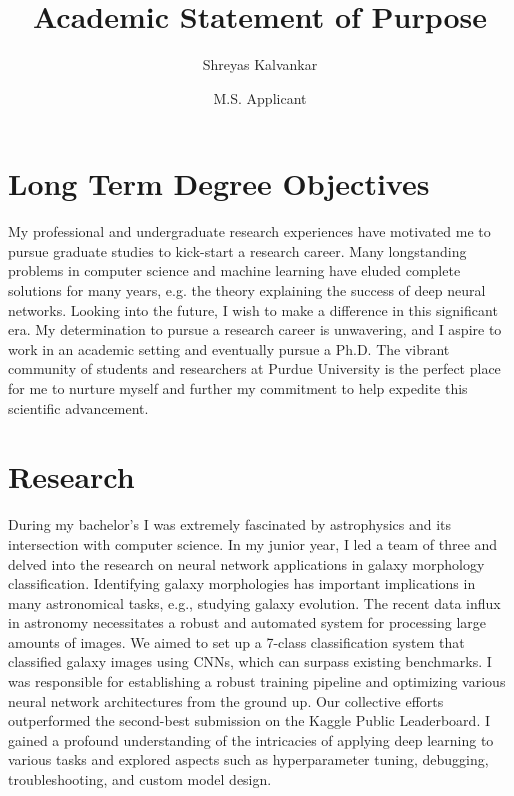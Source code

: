 \documentclass{article}
\title{Academic Statement of Purpose}
\author{Shreyas Kalvankar}
\date{M.S. Applicant}
\begin{document}
  \maketitle%
  \thispagestyle{empty}

\section*{Long Term Degree Objectives}

\hspace*{0.25in}My professional and undergraduate research experiences have motivated me to
pursue graduate studies to kick-start a research career. Many longstanding
problems in computer science and machine learning have eluded complete solutions
for many years, e.g. the theory explaining the success of deep neural networks.
Looking into the future, I wish to make a difference in this significant era. My
determination to pursue a research career is unwavering, and I aspire to work in
an academic setting and eventually pursue a Ph.D. The vibrant community of
students and researchers at Purdue University is the perfect place for me to
nurture myself and further my commitment to help expedite this scientific
advancement.

\section*{Research}

\hspace*{0.25in}During my bachelor's I was extremely fascinated by astrophysics
and its intersection with computer science. In my junior year, I led a team of
three and delved into the research on neural network applications in galaxy
morphology classification. Identifying galaxy morphologies has important
implications in many astronomical tasks, e.g., studying galaxy evolution. The
recent data influx in astronomy necessitates a robust and automated system for
processing large amounts of images. We aimed to set up a 7-class classification
system that classified galaxy images using CNNs, which can surpass existing
benchmarks. I was responsible for establishing a robust training pipeline and
optimizing various neural network architectures from the ground up. Our
collective efforts outperformed the second-best submission on the Kaggle Public
Leaderboard. I gained a profound understanding of the intricacies of applying
deep learning to various tasks and explored aspects such as hyperparameter
tuning, debugging, troubleshooting, and custom model design. \citep{kalvankar2020galaxy}
\end{document}

